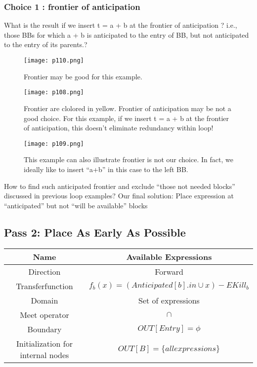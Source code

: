 \subsubsection{Choice 1 : frontier of anticipation}




What is the result if we insert t = a + b at the frontier of anticipation ?
i.e., those BBs for which a + b is anticipated to the entry of BB, but not anticipated
to the entry of its parents.?


\begin{figure}[H]
    \centering
     \texttt{[image: p110.png]}
         \caption{Frontier may be good for this example.}
         \label{fig:p110}
\end{figure}

\begin{figure}[H]
    \centering
     \texttt{[image: p108.png]}
         \caption{Frontier are clolored in yellow. Frontier of anticipation may be not a good choice. For this example, 
         if we insert t = a + b at the frontier of anticipation, this doesn't eliminate redundancy within loop!}
         \label{fig:p108}
\end{figure}



\begin{figure}[H]
    \centering
     \texttt{[image: p109.png]}
         \caption{This example can also illustrate frontier is not our choice. In fact, we ideally like to insert “a+b” in this case to the left BB.}
         \label{fig:p109}
\end{figure}


How to find such anticipated frontier and exclude “those not
needed blocks” discussed in previous loop examples? Our final solution: 
Place expression at “anticipated” but not “will be
available” blocks

\subsection{Pass 2: Place As Early As Possible}


\begin{center}
    \begin{tabular}{|c|c|}
   \hline Name & Available Expressions\\    
   \hline Direction & Forward\\
   \hline Transferfunction  & \( f_b(x) = (Anticipated[b].in \cup x ) - EKill_b \)\\
   \hline Domain & Set of expressions\\
   \hline Meet operator & \( \cap \)\\
   \hline Boundary & $OUT[Entry] = \phi$ \\  
   \hline Initialization for internal nodes & \( OUT[B] = \{ all expressions\} \) \\
   \hline
   \end{tabular}  
   \end{center}


